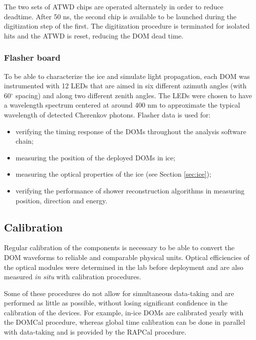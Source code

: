 The two sets of ATWD chips are operated alternately in order to reduce deadtime. After 50 ns, the second chip is available to be launched during the digitization step of the first. The digitization procedure is terminated for isolated hits and the ATWD is reset, reducing the DOM dead time.\\


\subsubsection{Flasher board}
\label{subsub:flasher}
To be able to characterize the ice and simulate light propagation, each DOM was instrumented with 12 LEDs that are aimed in six different azimuth angles (with 60$^\circ$ spacing) and along two different zenith angles. The LEDs were chosen to have a wavelength spectrum centered at around 400 nm to approximate the typical wavelength of detected Cherenkov photons. Flasher data is used for:
\vspace{2mm}
\begin{itemize}
\item verifying the timing response of the DOMs throughout the analysis software chain;
\item measuring the position of the deployed DOMs in ice;
\item measuring the optical properties of the ice (see Section \ref{sec:ice});
\item verifying the performance of shower reconstruction algorithms in measuring position, direction and energy.
\end{itemize}



\subsection{Calibration}
\label{subsec:calibration}
Regular calibration of the components is necessary to be able to convert the DOM waveforms to reliable and comparable physical units. Optical efficiencies of the optical modules were determined in the lab before deployment and are also measured \textit{in situ} with calibration procedures.

Some of these procedures do not allow for simultaneous data-taking and are performed as little as possible, without losing significant confidence in the calibration of the devices. For example, in-ice DOMs are calibrated yearly with the DOMCal procedure, whereas global time calibration can be done in parallel with data-taking and is provided by the RAPCal procedure.

